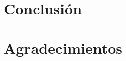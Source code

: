 \documentclass[fleqn,10pt]{UICArticle} %
\begin{document}
\section{Conclusión}


\section*{Agradecimientos}





\end{document}
